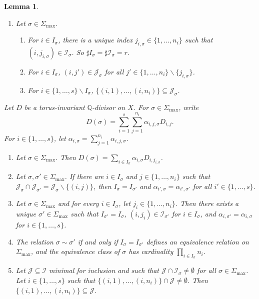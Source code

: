 \documentclass[10pt, a4paper, reqno, english]{amsart}
\newcommand\QQ{\mathbb{Q}}
\newcommand{\ii}[1]{\mathcal{J}_{#1}} %
\newcommand{\ic}[1]{\mathcal{I}_{#1}} %
\newtheorem{lemma}[theorem]{Lemma}
\theoremstyle{definition}
\numberwithin{theorem}{section}
\numberwithin{equation}{section}
\begin{document}
\begin{lemma}\label{lem:grouping_geom} \ 
\begin{enumerate}[label=(\roman*), ref=(\roman*)]
\item \label{item:grouping_geom_sigma}
 Let $\sigma\in\Sigma_{\max}$. 
\begin{enumerate}
\item For $i\in I_\sigma$,  there is a unique index $j_{i,\sigma}\in\{1,\dots,n_i\}$ such that $(i, j_{i,\sigma})\in\ic{\sigma}$. So $\sharp I_\sigma=\sharp \ic{\sigma}=r$.
\item For $i\in I_\sigma$, $(i,j')\in\ii{\sigma}$ for all $j'\in\{1,\dots,n_i\}\smallsetminus\{j_{i,\sigma}\}$.
\item For $i\in \{1,\dots,s\}\smallsetminus I_\sigma$, $\{(i,1),\dots,(i,n_{i})\}\subseteq\ii{\sigma}$.
\end{enumerate}
\end{enumerate}
Let $D$ be a torus-invariant $\QQ$-divisor on $X$.
For $\sigma\in\Sigma_{\max}$, write $$D(\sigma)=\sum_{i=1}^s\sum_{j=1}^{n_i}\alpha_{i,j,\sigma}D_{i,j}. $$ For $i\in\{1,\dots,s\}$, let $\alpha_{i,\sigma}=\sum_{j=1}^{n_i}\alpha_{i,j,\sigma}$. 
\begin{enumerate}[resume, label=(\roman*), ref=(\roman*)]
\item \label{item:grouping_geom_Lsigma} 
Let $\sigma\in\Sigma_{\max}$. Then $D(\sigma)=\sum_{i\in I_\sigma}\alpha_{i,\sigma}D_{i,j_{i,\sigma}}$.
\item \label{item:grouping_geom_alpha_isigma}
Let $\sigma,\sigma'\in\Sigma_{\max}$.
If there are $i\in I_{\sigma}$ and $j\in\{1,\dots,n_i\}$ such that  $\ii{\sigma}\cap\ii{\sigma'}=\ii{\sigma}\smallsetminus\{(i,j)\}$, then $I_\sigma=I_{\sigma'}$ and $\alpha_{i',\sigma}=\alpha_{i',\sigma'}$ for all $i'\in\{1,\dots,s\}$.
\item \label{item:grouping_geom_special_sigma}
Let $\sigma\in \Sigma_{\max}$ and for every $i\in I_\sigma$, let $j_i\in\{1,\dots,n_i\}$. Then there exists a unique $\sigma'\in\Sigma_{\max}$ such that $I_{\sigma'}=I_\sigma$,  $(i,j_i)\in\ic{\sigma'}$ for $i\in I_\sigma$, and $\alpha_{i,\sigma'}=\alpha_{i,\sigma}$ for  $i\in\{1,\dots,s\}$.
\item \label{item:grouping_equiv_rel}
The relation $\sigma\sim \sigma'$ if and only if $I_\sigma=I_{\sigma'}$ defines an equivalence relation on $\Sigma_{\max}$, and the equivalence class of $\sigma$ has cardinality $\prod_{i\in I_\sigma}n_i$.
\item \label{item:grouping_f}
Let $\mathcal J\subseteq\mathcal I$ minimal for inclusion and such that $ \mathcal J\cap\mathcal I_\sigma\neq\emptyset$ for all $\sigma\in\Sigma_{\max}$. Let $i\in\{1,\dots,s\}$ such that $\{(i,1),\dots,(i,n_i)\}\cap\mathcal J\neq\emptyset$. Then $\{(i,1),\dots,(i,n_i)\}\subseteq\mathcal J$.
\end{enumerate}
\end{lemma}
\end{document}
